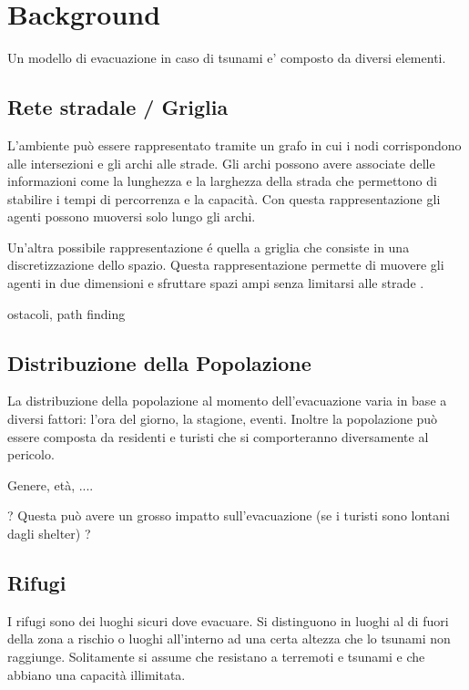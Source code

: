 \section{Background}
Un modello di evacuazione in caso di tsunami e' composto da diversi elementi.

\subsection{Rete stradale / Griglia}
L'ambiente può essere rappresentato tramite un grafo in cui i nodi corrispondono alle intersezioni e
gli archi alle strade.
Gli archi possono avere associate delle informazioni come la lunghezza e la larghezza della strada che
permettono di stabilire i tempi di percorrenza e la capacità.
Con questa rappresentazione gli agenti possono muoversi solo lungo gli archi.

Un'altra possibile rappresentazione é quella a griglia che consiste in una discretizzazione
dello spazio. Questa rappresentazione permette di muovere gli agenti in due dimensioni e sfruttare
spazi ampi senza limitarsi alle strade \cite{makinoshima2018enhancing}.

ostacoli, path finding


\subsection{Distribuzione della Popolazione}
La distribuzione della popolazione al momento dell'evacuazione varia in base a diversi fattori:
l'ora del giorno, la stagione, eventi. Inoltre la popolazione può essere composta da residenti e
turisti che si comporteranno diversamente al pericolo.

Genere, età, ....

? Questa può avere un grosso impatto sull'evacuazione (se i turisti sono lontani dagli shelter) ?


\subsection{Rifugi}
I rifugi sono dei luoghi sicuri dove evacuare.
Si distinguono in luoghi al di fuori della zona a rischio o
luoghi all'interno ad una certa altezza che lo tsunami non raggiunge.
%
Solitamente si assume che resistano a terremoti e tsunami e
che abbiano una capacità illimitata.

